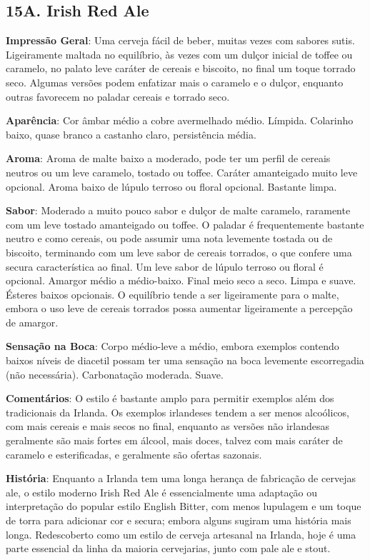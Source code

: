 \subsection*{15A. Irish Red Ale}
\textbf{Impressão Geral}: Uma cerveja fácil de beber, muitas vezes com sabores sutis. Ligeiramente maltada no equilíbrio, às vezes com um dulçor inicial de toffee ou caramelo, no palato leve caráter de cereais e biscoito, no final um toque torrado seco. Algumas versões podem enfatizar mais o caramelo e o dulçor, enquanto outras favorecem no paladar cereais e torrado seco.

\textbf{Aparência}: Cor âmbar médio a cobre avermelhado médio. Límpida. Colarinho baixo, quase branco a castanho claro, persistência média.

\textbf{Aroma}: Aroma de malte baixo a moderado, pode ter um perfil de cereais neutros ou um leve caramelo, tostado ou toffee. Caráter amanteigado muito leve opcional. Aroma baixo de lúpulo terroso ou floral opcional. Bastante limpa.

\textbf{Sabor}: Moderado a muito pouco sabor e dulçor de malte caramelo, raramente com um leve tostado amanteigado ou toffee. O paladar é frequentemente bastante neutro e como cereais, ou pode assumir uma nota levemente tostada ou de biscoito, terminando com um leve sabor de cereais torrados, o que confere uma secura característica ao final. Um leve sabor de lúpulo terroso ou floral é opcional. Amargor médio a médio-baixo. Final meio seco a seco. Limpa e suave. Ésteres baixos opcionais. O equilíbrio tende a ser ligeiramente para o malte, embora o uso leve de cereais torrados possa aumentar ligeiramente a percepção de amargor.

\textbf{Sensação na Boca}: Corpo médio-leve a médio, embora exemplos contendo baixos níveis de diacetil possam ter uma sensação na boca levemente escorregadia (não necessária). Carbonatação moderada. Suave.

\textbf{Comentários}: O estilo é bastante amplo para permitir exemplos além dos tradicionais da Irlanda. Os exemplos irlandeses tendem a ser menos alcoólicos, com mais cereais e mais secos no final, enquanto as versões não irlandesas geralmente são mais fortes em álcool, mais doces, talvez com mais caráter de caramelo e esterificadas, e geralmente são ofertas sazonais.

\textbf{História}: Enquanto a Irlanda tem uma longa herança de fabricação de cervejas ale, o estilo moderno Irish Red Ale é essencialmente uma adaptação ou interpretação do popular estilo English Bitter, com menos lupulagem e um toque de torra para adicionar cor e secura; embora alguns sugiram uma história mais longa. Redescoberto como um estilo de cerveja artesanal na Irlanda, hoje é uma parte essencial da linha da maioria cervejarias, junto com pale ale e stout.

